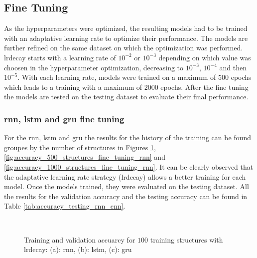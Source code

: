 \documentclass[conference]{IEEEtran}
\begin{document}
\subsection{Fine Tuning}

As the hyperparameters were optimized, the resulting models had to be trained with an adaptative learning rate to optimize their performance. The models are further refined on the same dataset on which the optimization was performed. \gls{lrdecay} starts with a learning rate of $10^{-2}$ or $10^{-3}$ depending on which value was choosen in the hyperparameter optimization, decreasing to $10^{-3}$, $10^{-4}$ and then $10^{-5}$. With each learning rate, models were trained on a maximum of $ 500 $ epochs which leads to a training with a maximum of $ 2000 $ epochs. After the fine tuning the models are tested on the testing dataset to evaluate their final performance.

\subsubsection{\gls{rnn}, \gls{lstm} and \gls{gru} fine tuning}

For the \gls{rnn}, \gls{lstm} and \gls{gru} the results for the history of the training can be found groupes by the number of structures in Figures \ref{fig:accuracy_100_structures_fine_tuning_rnn}, \ref{fig:accuracy_500_structures_fine_tuning_rnn} and \ref{fig:accuracy_1000_structures_fine_tuning_rnn}. It can be clearly observed that the adaptative learning rate strategy (\gls{lrdecay}) allows a better training for each model. Once the models trained, they were evaluated on the testing dataset. All the results for the validation accuracy and the testing accuracy can be found in Table \ref{tab:accuracy_testing_rnn_cnn}.  

\begin{figure}[htp]
	\centering
	\quad
	\\
	\caption{Training and validation accuarcy for $ 100 $ training structures with \gls{lrdecay}: (a): \gls{rnn}, (b): \gls{lstm}, (c): \gls{gru}}
	\label{fig:accuracy_100_structures_fine_tuning_rnn}
\end{figure}
\end{document}
